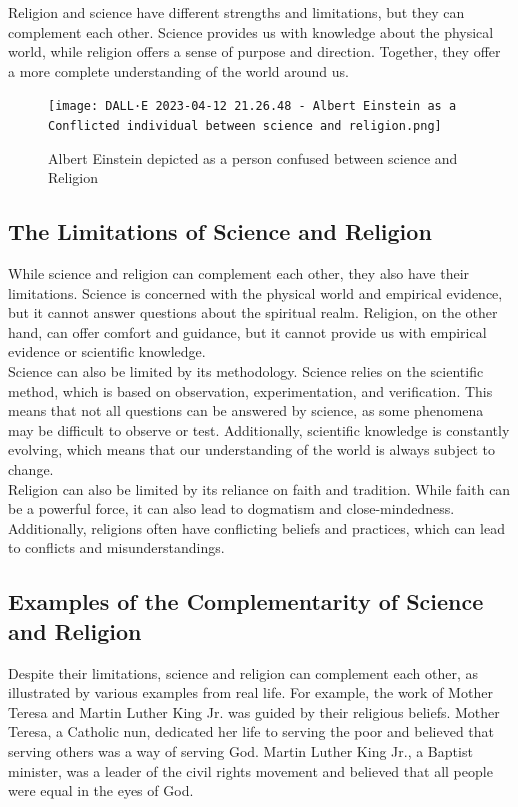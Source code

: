 \documentclass[11pt]{article}
\begin{document}
Religion and science have different strengths and limitations, but they can complement each other. Science provides us with knowledge about the physical world, while religion offers a sense of purpose and direction. Together, they offer a more complete understanding of the world around us.

\begin{figure}[H]
	\centering
	\texttt{[image: DALL·E 2023-04-12 21.26.48 - Albert Einstein as a Conflicted individual between science and religion.png]}
	\caption{Albert Einstein depicted as a person confused between science and Religion}
\end{figure}

\subsection{The Limitations of Science and Religion}

While science and religion can complement each other, they also have their limitations. Science is concerned with the physical world and empirical evidence, but it cannot answer questions about the spiritual realm. Religion, on the other hand, can offer comfort and guidance, but it cannot provide us with empirical evidence or scientific knowledge.\\

Science can also be limited by its methodology. Science relies on the scientific method, which is based on observation, experimentation, and verification. This means that not all questions can be answered by science, as some phenomena may be difficult to observe or test. Additionally, scientific knowledge is constantly evolving, which means that our understanding of the world is always subject to change.\\

Religion can also be limited by its reliance on faith and tradition. While faith can be a powerful force, it can also lead to dogmatism and close-mindedness. Additionally, religions often have conflicting beliefs and practices, which can lead to conflicts and misunderstandings.

\subsection{Examples of the Complementarity of Science and Religion}

Despite their limitations, science and religion can complement each other, as illustrated by various examples from real life. For example, the work of Mother Teresa and Martin Luther King Jr. was guided by their religious beliefs. Mother Teresa, a Catholic nun, dedicated her life to serving the poor and believed that serving others was a way of serving God. Martin Luther King Jr., a Baptist minister, was a leader of the civil rights movement and believed that all people were equal in the eyes of God.\\
\end{document}
